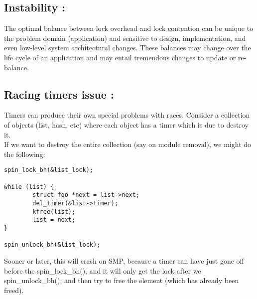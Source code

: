 \documentclass[a4paper]{article}
\begin{document}
\subsection{Instability :}
The optimal balance between lock overhead and lock contention can be unique to the problem domain (application) and sensitive to design, implementation, and even low-level system architectural changes. These balances may change over the life cycle of an application and may entail tremendous changes to update or re-balance.\\

\subsection{Racing timers issue :}
Timers can produce their own special problems with races. Consider a collection of objects (list, hash, etc) where each object has a timer which is due to destroy it.\\
If we want to destroy the entire collection (say on module removal), we might do the following:
\begin{verbatim}
spin_lock_bh(&list_lock);

while (list) {
        struct foo *next = list->next;
        del_timer(&list->timer);
        kfree(list);
        list = next;
}

spin_unlock_bh(&list_lock);

\end{verbatim}
Sooner or later, this will crash on SMP, because a timer can have just gone off before the spin\_lock\_bh(), and it will only get the lock after we spin\_unlock\_bh(), and then try to free the element (which has already been freed).
\end{document}
